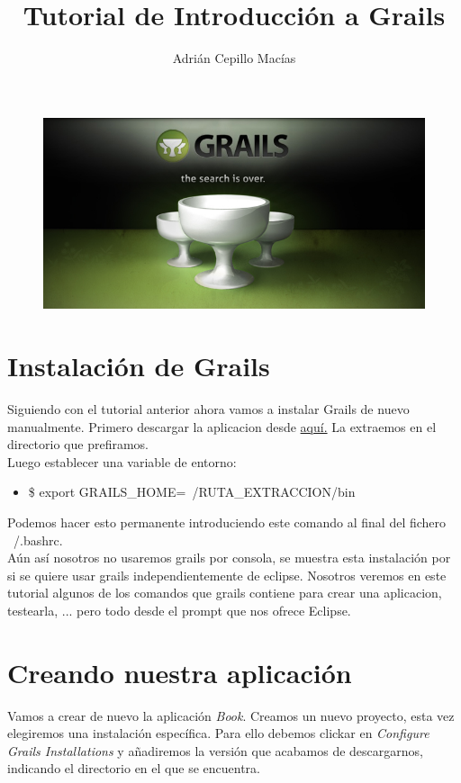 \documentclass[a4paper,12pt,spanish]{article}
\author{Adrián Cepillo Macías}
\title{Tutorial de Introducción a Grails}
\begin{document}
\begin{titlepage}
  \maketitle
  \begin{figure}[h!]
    \centering
    \vspace{1in}
    \includegraphics[scale=0.65]{grailsportada}
    \label{fig:Portada}
  \end{figure}
\end{titlepage}
 
\tableofcontents
\newpage 

\section{Instalación de Grails}
Siguiendo con el tutorial anterior ahora vamos a instalar Grails de nuevo manualmente. Primero descargar la aplicacion desde \href{http://grails.org/Download}{aquí.} La extraemos en el directorio que prefiramos.\\

Luego establecer una variable de entorno:
\begin{itemize}
\item \$ export GRAILS\_HOME=~/RUTA\_EXTRACCION/bin
\end{itemize}

Podemos hacer esto permanente introduciendo este comando al final del fichero ~/.bashrc.\\

Aún así nosotros no usaremos grails por consola, se muestra esta instalación por si se quiere usar grails independientemente de eclipse. Nosotros veremos en este tutorial algunos de los comandos que grails contiene para crear una aplicacion, testearla, ... pero todo desde el prompt que nos ofrece Eclipse.

\section{Creando nuestra aplicación}
Vamos a crear de nuevo la aplicación {\it Book}. Creamos un nuevo proyecto, esta vez elegiremos una instalación específica. Para ello debemos clickar en {\it Configure Grails Installations} y añadiremos la versión que acabamos de descargarnos, indicando el directorio en el que se encuentra.\\
\end{document}
